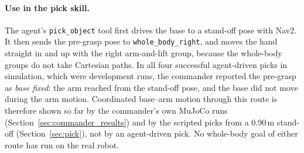 \documentclass[12pt,a4paper]{article}
\begin{document}
\paragraph{Use in the pick skill.}
The agent's \texttt{pick\_object} tool first drives the base to a stand-off pose with Nav2. It then sends
the pre-grasp pose to \texttt{whole\_body\_right}, and moves the hand straight in and up with the right
arm-and-lift group, because the whole-body groups do not take Cartesian paths. In all four successful
agent-driven picks in simulation, which were development runs, the commander reported the pre-grasp as
\emph{base fixed}: the arm reached from the stand-off pose, and the base did not move during the arm
motion. Coordinated base--arm motion through this route is therefore shown so far by the commander's own
MuJoCo runs (Section~\ref{sec:commander_results}) and by the scripted picks from a 0.90\,m stand-off
(Section~\ref{sec:pick}), not by an agent-driven pick. No whole-body goal of either
route has run on the real robot.
\end{document}
